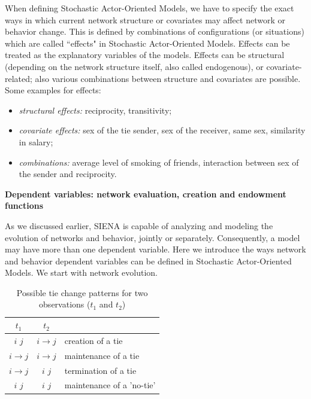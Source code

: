 \documentclass[a4paper,fleqn,11pt]{article}
\newcommand{\+}{\, + \,}
\newcommand{\SI}{{\sf SIENA }}
\newcommand{\saom}{{Stochastic Actor-Oriented Model}}
\begin{document}
When defining {\saom}s, we have to specify
the exact ways in which current network structure or covariates may affect
network or behavior change. This is defined
by combinations of configurations (or situations) which
are called ``effects" in {\saom}s.
Effects can be treated as the explanatory variables of the models.
Effects can be structural (depending on the network structure itself,
also called endogenous), or covariate-related; also various combinations
between structure and covariates are possible. Some examples for effects:
\begin{itemize}
	\item \emph{structural effects:} reciprocity, transitivity;
	\item \emph{covariate effects:} sex of the tie sender, sex of the receiver,
                same sex, similarity in salary;
	\item \emph{combinations:} average level of smoking of friends,
                interaction between sex of the sender and reciprocity.\\
\end{itemize}

\noindent
\textbf{Dependent variables: network evaluation, creation and endowment functions}\\
\label{S_endow}

As we discussed earlier, \SI is capable of analyzing and modeling the
evolution of networks and behavior, jointly or separately.
Consequently, a model may have more than one dependent variable.
Here we introduce the ways network and behavior dependent variables
can be defined in {\saom}s. We start with network evolution.

\def\Fspace{\space\space\space\space}
\begin{table}[h]
	\centering
	\caption{Possible tie change patterns for two observations ($t_1$ and $t_2$)}
	\label{tab:TCpat}
	\vspace{\baselineskip}
	\begin{tabular}{c | c | l}
		$t_{1}$ 				& $t_{2}$ 				&														\\ \hline
		$i$ \Fspace $j$ & $i  \to 		 j$	& creation of a tie 				\\
		$i  \to			 j$	& $i  \to 		 j$	& maintenance of a tie 			\\
		$i  \to			 j$	& $i$ \Fspace $j$ & termination of a tie 			\\
		$i$ \Fspace $j$	& $i$ \Fspace $j$ & maintenance of a 'no-tie' \\
	\end{tabular}
\end{table}
\end{document}

